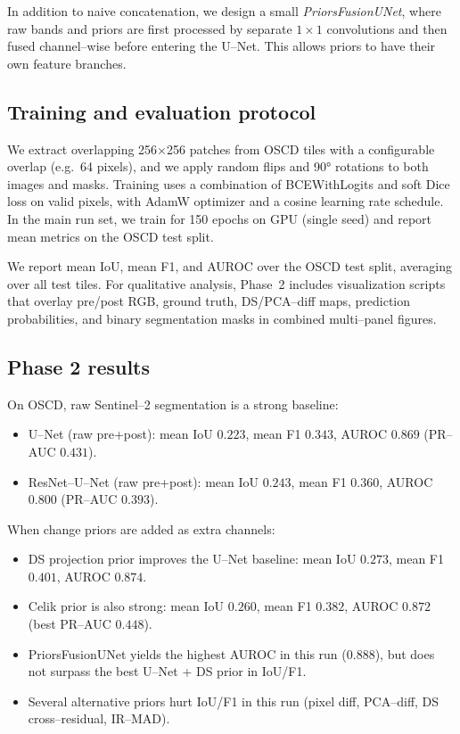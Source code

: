 \documentclass[twoside,11pt]{article}
\begin{document}
In addition to naive concatenation, we design a small
\emph{PriorsFusionUNet}, where raw bands and priors are first processed by
separate \(1\times 1\) convolutions and then fused channel--wise before
entering the U--Net. This allows priors to have their own feature branches.

\subsection{Training and evaluation protocol}

We extract overlapping 256\(\times\)256 patches from OSCD tiles with a
configurable overlap (e.g.\ 64 pixels), and we apply random flips and 90°
rotations to both images and masks. Training uses a combination of
BCEWithLogits and soft Dice loss on valid pixels, with AdamW optimizer and a
cosine learning rate schedule. In the main run set, we train for 150 epochs
on GPU (single seed) and report mean metrics on the OSCD test split.

We report mean IoU, mean F1, and AUROC over the OSCD test split, averaging
over all test tiles. For qualitative analysis, Phase~2 includes visualization
scripts that overlay pre/post RGB, ground truth, DS/PCA--diff maps, prediction
probabilities, and binary segmentation masks in combined multi--panel figures.

\subsection{Phase 2 results}

On OSCD, raw Sentinel--2 segmentation is a strong baseline:
\begin{itemize}
  \item U--Net (raw pre+post): mean IoU \(0.223\), mean F1 \(0.343\),
  AUROC \(0.869\) (PR--AUC \(0.431\)).
  \item ResNet--U--Net (raw pre+post): mean IoU \(0.243\), mean F1 \(0.360\),
  AUROC \(0.800\) (PR--AUC \(0.393\)).
\end{itemize}

When change priors are added as extra channels:
\begin{itemize}
  \item DS projection prior improves the U--Net baseline:
  mean IoU \(0.273\), mean F1 \(0.401\), AUROC \(0.874\).
  \item Celik prior is also strong:
  mean IoU \(0.260\), mean F1 \(0.382\), AUROC \(0.872\) (best PR--AUC \(0.448\)).
  \item PriorsFusionUNet yields the highest AUROC in this run (\(0.888\)),
  but does not surpass the best U--Net + DS prior in IoU/F1.
  \item Several alternative priors hurt IoU/F1 in this run (pixel diff,
  PCA--diff, DS cross--residual, IR--MAD).
\end{itemize}
\end{document}
